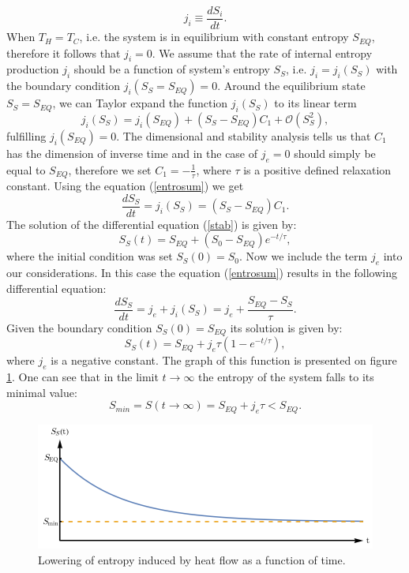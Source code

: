 \documentclass[a4paper,12pt]{article}
\begin{document}
\begin{equation}
j_i \equiv \frac{dS_i}{dt}.   
\end{equation} 
When $T_H=T_C$, i.e. the system is in equilibrium with constant entropy $S_{EQ}$, therefore it follows that $j_i=0$.
We assume that the rate of internal entropy production $j_i$ should be a function  of system's entropy $S_S$, i.e. $j_i = j_i(S_S)$ with the boundary condition $j_i(S_S=S_{EQ})=0$. Around the equilibrium state $S_S=S_{EQ}$, we can Taylor expand the function $j_i(S_S)$ to its linear term
\begin{equation}
j_i(S_S)=j_i\left(S_{EQ}\right)+\left(S_S-S_{EQ}\right)C_1+\mathcal{O}\left(S_S^2\right),
\end{equation} 
fulfilling $j_i\left(S_{EQ}\right)=0$. The dimensional and stability analysis tells us that $C_1$ has the dimension of inverse time and in the case of 
$j_e=0$ should simply be equal to $S_{EQ}$, therefore we set $C_1 = -\frac{1}{\tau}$, where $\tau$ is a positive defined relaxation constant. Using the equation (\ref{entrosum}) we get
\begin{equation}
\label{stab}
\frac{dS_S}{dt}=j_i\left(S_S\right)=\left(S_S-S_{EQ}\right)C_1.
\end{equation} 
The solution of the differential equation (\ref{stab}) is given by:
\begin{equation}
S_S(t) =S_{EQ}+(S_0-S_{EQ})e^{-t/\tau}, 
\end{equation}
where the initial condition was set $S_S(0)=S_0$. Now we include the term $j_e$ into our considerations.
In this case the equation (\ref{entrosum}) results in the following differential equation:
\begin{equation}
\frac{dS_S}{dt}=j_e + j_i\left(S_S\right)=j_e +\frac{S_{EQ}-S_S}{\tau}.
\label{dSSdt}
\end{equation} 
Given the boundary condition $S_S(0) =S_{EQ}$ its solution is given by:
\begin{equation}
S_S(t)=S_{EQ}+j_e\tau \left(1-e^{-t/\tau }\right),
\end{equation} 
where $j_e$ is a negative constant. The graph of this function is presented on figure \ref{Fig3}. 
One can see that in the limit $t\rightarrow \infty$ the entropy of the system falls to its minimal value:
\begin{equation}
S_{min}=S(t\rightarrow \infty) =S_{EQ}+j_e \tau < S_{EQ}.
\end{equation}

\begin{figure}[ht!]
\centering \includegraphics[width=12cm]{wykres3} 
\caption{Lowering of entropy induced by heat flow as a function of time.}
\label{Fig3} 
\end{figure}
\end{document}
